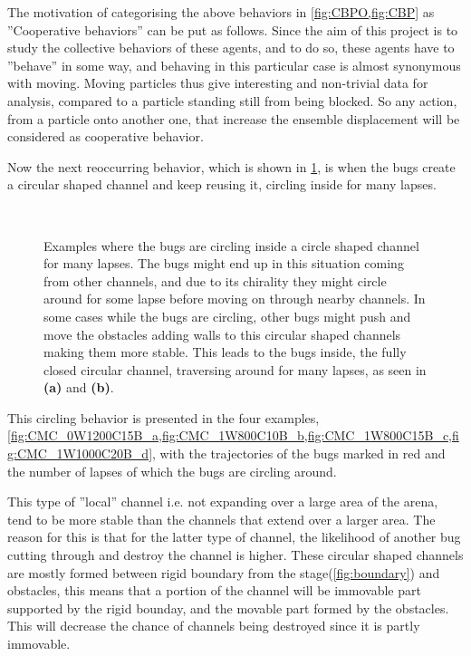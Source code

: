 The motivation of categorising the above behaviors in \cref{fig:CBPO,fig:CBP} as 
''Cooperative behaviors'' can be put as follows. Since 
the aim of this project is to study the collective behaviors of these agents, 
and to do so, these agents have to ''behave'' in some way, and behaving in 
this particular case is almost synonymous with moving. Moving particles thus give 
interesting and non-trivial data for analysis, compared to a particle standing still 
from being blocked. So any action, from a particle onto another one, that increase the 
ensemble displacement will be considered as cooperative behavior.


Now the next reoccurring behavior, which is shown in \cref{fig:CMC}, is when the bugs 
create a circular shaped channel and keep reusing it, circling inside for many lapses. 


\begin{figure}[htpb!]
\centering
{}\quad
{}\\
\quad
{}
\caption{Examples where the bugs are circling inside a circle shaped channel for many lapses. 
The bugs might end up in this situation coming from other channels, and due to its chirality 
they might circle around for some lapse before moving on through nearby channels. In 
some cases while the bugs are circling, other bugs might push and move the obstacles adding 
walls to this circular shaped channels making them more stable. This leads to the bugs inside, 
the fully closed circular channel, traversing around for many lapses, as seen in \textbf{(a)} and \textbf{(b)}.} 
\label{fig:CMC}
\end{figure}

This circling behavior is presented in the four examples, \cref{fig:CMC_0W1200C15B_a,fig:CMC_1W800C10B_b,fig:CMC_1W800C15B_c,fig:CMC_1W1000C20B_d}, 
with the trajectories of the bugs marked in red and the number of lapses of which the bugs are circling around. 

This type of ''local'' channel i.e. not expanding over a large area of the arena, tend to be more stable 
than the channels that extend over a larger area. The reason for this is that for the latter type of 
channel, the likelihood of another bug cutting through and destroy the channel is higher. 
These circular shaped channels are mostly formed between rigid boundary from the stage(\cref{fig:boundary}) 
and obstacles, this means that 
a portion of the channel will be immovable part supported by the rigid bounday, and the movable part formed 
by the obstacles. This will decrease the chance of channels being destroyed since it is partly immovable.

